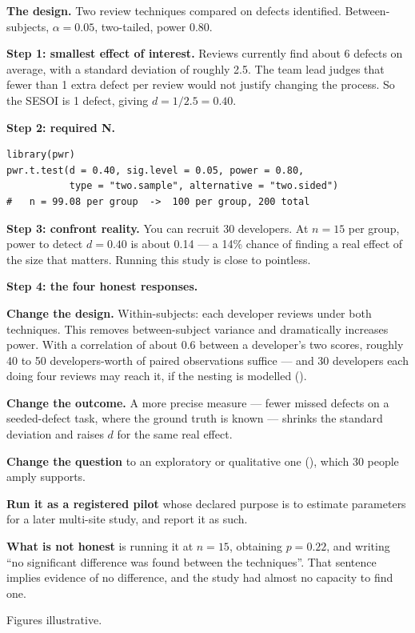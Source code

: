 \begin{worked}
\textbf{The design.} Two review techniques compared on defects identified.
Between-subjects, $\alpha = 0.05$, two-tailed, power 0.80.

\medskip
\textbf{Step 1: smallest effect of interest.} Reviews currently find about 6
defects on average, with a standard deviation of roughly 2.5. The team lead
judges that fewer than 1 extra defect per review would not justify changing
the process. So the SESOI is 1 defect, giving
$d = 1 / 2.5 = 0.40$.

\medskip
\textbf{Step 2: required N.}
\begin{lstlisting}[language=Rlang]
library(pwr)
pwr.t.test(d = 0.40, sig.level = 0.05, power = 0.80,
           type = "two.sample", alternative = "two.sided")
#   n = 99.08 per group  ->  100 per group, 200 total
\end{lstlisting}

\medskip
\textbf{Step 3: confront reality.} You can recruit 30 developers. At $n = 15$
per group, power to detect $d = 0.40$ is about 0.14 --- a 14\% chance of
finding a real effect of the size that matters. Running this study is close to
pointless.

\medskip
\textbf{Step 4: the four honest responses.}
\begin{tight}
  \item \textbf{Change the design.} Within-subjects: each developer reviews
    under both techniques. This removes between-subject variance and
    dramatically increases power. With a correlation of about 0.6 between a
    developer's two scores, roughly 40 to 50 developers-worth of paired
    observations suffice --- and 30 developers each doing four reviews may
    reach it, if the nesting is modelled ().
  \item \textbf{Change the outcome.} A more precise measure --- fewer missed
    defects on a seeded-defect task, where the ground truth is known --- shrinks
    the standard deviation and raises $d$ for the same real effect.
  \item \textbf{Change the question} to an exploratory or qualitative one
    (), which 30 people amply supports.
  \item \textbf{Run it as a registered pilot} whose declared purpose is to
    estimate parameters for a later multi-site study, and report it as such.
\end{tight}

\medskip
\textbf{What is not honest} is running it at $n = 15$, obtaining $p = 0.22$,
and writing ``no significant difference was found between the techniques''.
That sentence implies evidence of no difference, and the study had almost no
capacity to find one.

\medskip
Figures illustrative.
\end{worked}

